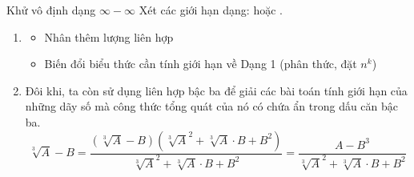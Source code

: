 \begin{dang}{Khử vô định dạng $\infty -\infty $}
	Xét các giới hạn dạng:  hoặc .
	\begin{enumerate}[\iconCV]
		\item {}
		\begin{itemize}
			\item Nhân thêm lượng liên hợp
			\item Biến đổi biểu thức cần tính giới hạn về Dạng 1 (phân thức, đặt $n^k$) 
		\end{itemize}
		\item {} Đôi khi, ta còn sử dụng liên hợp bậc ba để giải các bài toán tính giới hạn của những dãy số mà công thức tổng quát của nó có chứa ẩn trong dấu căn bậc ba. 
		$$\sqrt[3]{A}-B=\dfrac{\left( \sqrt[3]{A}-B\right) \left(\sqrt[3]{A}^2+\sqrt[3]{A}\cdot B + B^2 \right) }{\sqrt[3]{A}^2+\sqrt[3]{A}\cdot B + B^2}=\dfrac{A-B^3}{\sqrt[3]{A}^2+\sqrt[3]{A}\cdot B + B^2}$$
	\end{enumerate}
\end{dang}

